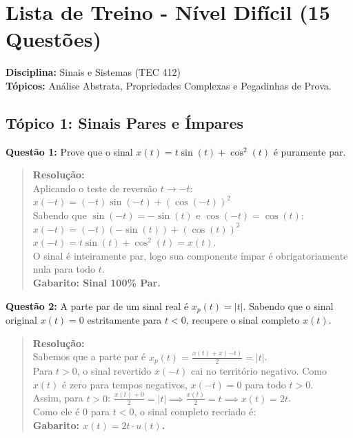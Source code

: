 \chapter{Lista de Treino - Nível Difícil (15 Questões)}

\textbf{Disciplina:} Sinais e Sistemas (TEC 412)\\
\textbf{Tópicos:} Análise Abstrata, Propriedades Complexas e Pegadinhas de Prova.

\section{Tópico 1: Sinais Pares e Ímpares}\label{tuxf3pico-1-sinais-pares-e-uxedmpares}

\textbf{Questão 1:} Prove que o sinal \(x(t) = t \sin(t) + \cos^2(t)\) é puramente par.

\begin{quote}
\textbf{Resolução:}\\
Aplicando o teste de reversão \(t \to -t\):\\
\(x(-t) = (-t) \sin(-t) + (\cos(-t))^2\)\\
Sabendo que \(\sin(-t) = -\sin(t)\) e \(\cos(-t) = \cos(t)\):\\
\(x(-t) = (-t)(-\sin(t)) + (\cos(t))^2\)\\
\(x(-t) = t \sin(t) + \cos^2(t) = x(t)\).\\
O sinal é inteiramente par, logo sua componente ímpar é obrigatoriamente nula para todo \(t\).\\
\textbf{Gabarito: Sinal 100\% Par.}
\end{quote}

\textbf{Questão 2:} A parte par de um sinal real é \(x_p(t) = |t|\). Sabendo que o sinal original \(x(t) = 0\) estritamente para \(t < 0\), recupere o sinal completo \(x(t)\).

\begin{quote}
\textbf{Resolução:}\\
Sabemos que a parte par é \(x_p(t) = \frac{x(t) + x(-t)}{2} = |t|\).\\
Para \(t > 0\), o sinal revertido \(x(-t)\) cai no território negativo. Como \(x(t)\) é zero para tempos negativos, \(x(-t) = 0\) para todo \(t>0\).\\
Assim, para \(t > 0\): \(\frac{x(t) + 0}{2} = |t| \implies \frac{x(t)}{2} = t \implies x(t) = 2t\).\\
Como ele é \(0\) para \(t < 0\), o sinal completo recriado é:\\
\textbf{Gabarito: \(x(t) = 2t \cdot u(t)\).}
\end{quote}

